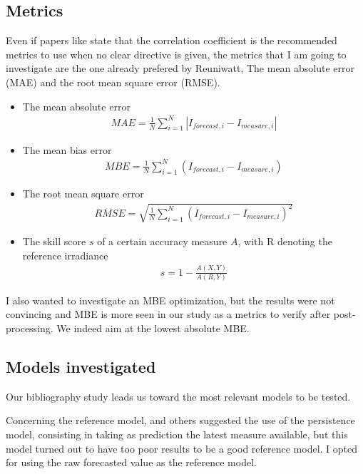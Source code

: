 \subsection{Metrics}
Even if papers like \cite{mayer_calibration_2023} state that the correlation coefficient is the recommended metrics to use when no clear directive is given, the metrics 
that I am going to investigate are the one already prefered by Reuniwatt, The mean absolute error (MAE) and the root mean square error (RMSE). 


\begin{itemize}
    \item The mean absolute error \begin{align*}
        MAE = \frac{1}{N} \sum_{i=1}^{N} | I_{forecast, i} - I_{measure, i} |
    \end{align*}

    \item The mean bias error \begin{align*}
        MBE = \frac{1}{N} \sum_{i=1}^{N} ( I_{forecast, i} - I_{measure, i} )
    \end{align*}

    \item The root mean square error \begin{align*}
        RMSE = \sqrt{\frac{1}{N} \sum_{i=1}^{N} ( I_{forecast, i} - I_{measure, i} ) ^{2}}
    \end{align*}

    \item The skill score $s$  of a certain accuracy measure $A$, with R denoting the reference irradiance
    \begin{align*}
        s = 1 - \frac{A(X,Y)}{A(R,Y)}
    \end{align*}
\end{itemize}

I also wanted to investigate an MBE optimization, but the results were not convincing and MBE is more seen in our study as a metrics to verify after post-processing.
We indeed aim at the lowest absolute MBE.
\subsection{Models investigated}
Our bibliography study leads us toward the most relevant models to be tested.

Concerning the reference model, \cite{lorenz_benchmarking_nodate} and others suggested the use of the persistence model, consisting in taking as prediction the latest measure available,
but this model turned out to have too poor results to be a good reference model. I opted for using the raw forecasted value as the reference model.

